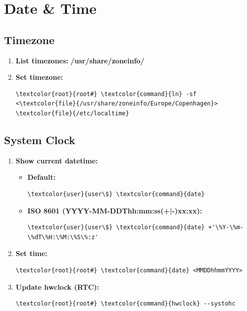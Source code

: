 \documentclass[10pt, a4paper, onecolumn, oneside, titlepage, openany]{book}
\begin{document}
\section{Date \& Time}
\subsection{Timezone}
\begin{enumerate}
    \item \textbf{List timezones:}
\newline \textbf{\textcolor{dir}{/usr/share/zoneinfo/}}
    \item \textbf{Set timezone:}
\begin{Verbatim}[commandchars=\\\{\}]
\textcolor{root}{root#} \textcolor{command}{ln} -sf <\textcolor{file}{/usr/share/zoneinfo/Europe/Copenhagen}> \textcolor{file}{/etc/localtime}
\end{Verbatim}
\end{enumerate}
\subsection{System Clock}
\begin{enumerate}
    \item \textbf{Show current datetime:}
    \begin{itemize}
        \item \textbf{Default:}
\begin{Verbatim}[commandchars=\\\{\}]
\textcolor{user}{user\$} \textcolor{command}{date}
\end{Verbatim}
        \item \textbf{ISO 8601 (YYYY-MM-DDThh:mm:ss(+|-)xx:xx):}
\begin{Verbatim}[commandchars=\\\{\}]
\textcolor{user}{user\$} \textcolor{command}{date} +'\%Y-\%m-\%dT\%H:\%M:\%S\%:z'
\end{Verbatim}
    \end{itemize}
    \item \textbf{Set time:}
\begin{Verbatim}[commandchars=\\\{\}]
\textcolor{root}{root#} \textcolor{command}{date} <MMDDhhmmYYYY>
\end{Verbatim}
    \item \textbf{Update hwclock (RTC):}
\begin{Verbatim}[commandchars=\\\{\}]
\textcolor{root}{root#} \textcolor{command}{hwclock} --systohc
\end{Verbatim}
\end{enumerate}
\end{document}
